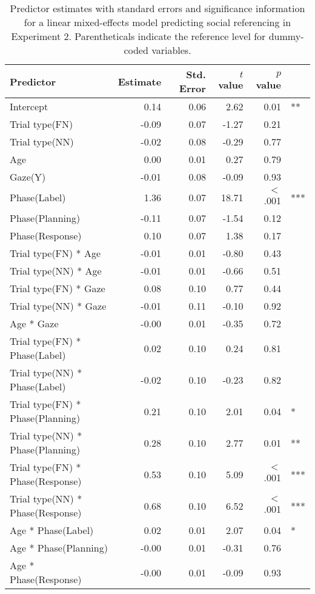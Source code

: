 \documentclass[english,man]{apa6}
\theoremstyle{definition}
\theoremstyle{definition}
\theoremstyle{definition}
\theoremstyle{remark}
\begin{document}
\begin{longtable}{lrrrrl}
\caption{Predictor estimates with standard errors and significance information for a linear mixed-effects model predicting social referencing in Experiment 2. Parentheticals indicate the reference level for dummy-coded variables.} \\ 
 Predictor & Estimate & Std. Error & $t$ value & $p$ value &  \\ 
  \hline
Intercept & 0.14 & 0.06 & 2.62 & 0.01 & ** \\ 
  Trial type(FN) & -0.09 & 0.07 & -1.27 & 0.21 &  \\ 
  Trial type(NN) & -0.02 & 0.08 & -0.29 & 0.77 &  \\ 
  Age & 0.00 & 0.01 & 0.27 & 0.79 &  \\ 
  Gaze(Y) & -0.01 & 0.08 & -0.09 & 0.93 &  \\ 
  Phase(Label) & 1.36 & 0.07 & 18.71 & $<$ .001 & *** \\ 
  Phase(Planning) & -0.11 & 0.07 & -1.54 & 0.12 &  \\ 
  Phase(Response) & 0.10 & 0.07 & 1.38 & 0.17 &  \\ 
  Trial type(FN) * Age & -0.01 & 0.01 & -0.80 & 0.43 &  \\ 
  Trial type(NN) * Age & -0.01 & 0.01 & -0.66 & 0.51 &  \\ 
  Trial type(FN) * Gaze & 0.08 & 0.10 & 0.77 & 0.44 &  \\ 
  Trial type(NN) * Gaze & -0.01 & 0.11 & -0.10 & 0.92 &  \\ 
  Age * Gaze & -0.00 & 0.01 & -0.35 & 0.72 &  \\ 
  Trial type(FN) * Phase(Label) & 0.02 & 0.10 & 0.24 & 0.81 &  \\ 
  Trial type(NN) * Phase(Label) & -0.02 & 0.10 & -0.23 & 0.82 &  \\ 
  Trial type(FN) * Phase(Planning) & 0.21 & 0.10 & 2.01 & 0.04 & * \\ 
  Trial type(NN) * Phase(Planning) & 0.28 & 0.10 & 2.77 & 0.01 & ** \\ 
  Trial type(FN) * Phase(Response) & 0.53 & 0.10 & 5.09 & $<$ .001 & *** \\ 
  Trial type(NN) * Phase(Response) & 0.68 & 0.10 & 6.52 & $<$ .001 & *** \\ 
  Age * Phase(Label) & 0.02 & 0.01 & 2.07 & 0.04 & * \\ 
  Age * Phase(Planning) & -0.00 & 0.01 & -0.31 & 0.76 &  \\ 
  Age * Phase(Response) & -0.00 & 0.01 & -0.09 & 0.93 &  \\ 

\end{longtable}
\end{document}
